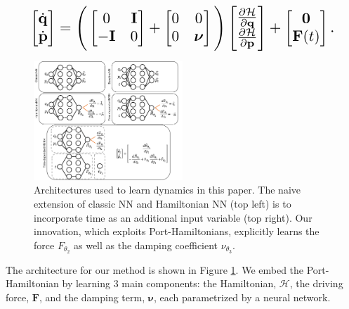 \documentclass[twoside]{article}
\begin{document}
\begin{equation}
\resizebox{0.9\linewidth}{!}{$%
\begin{bmatrix}
\dot{\mathbf{q}} \\
\dot{\mathbf{p}}
\end{bmatrix}
=
\Bigg(\begin{bmatrix}
0 & \mathbf{I} \\
-\mathbf{I} & 0
\end{bmatrix} +
\begin{bmatrix}
0 & 0 \\
0 & \boldsymbol\nu
\end{bmatrix}
 \Bigg)
 \begin{bmatrix}
\frac{\partial \mathcal{H}}{\partial \mathbf{q}} \\
\frac{\partial \mathcal{H}}{\partial \mathbf{p}}
\end{bmatrix}
+
\begin{bmatrix}
\mathbf{0} \\
\mathbf{F}(t)
\end{bmatrix}.
$%
}%
\label{eqn.pham1}
\end{equation}
\begin{figure}[h!]
\centering
\includegraphics[width=0.5\textwidth]{figures/architecture1.pdf}
\caption{Architectures used to learn dynamics in this paper. The naive extension of classic NN and Hamiltonian NN (top left) is to incorporate time as an additional input variable (top right). Our innovation, which exploits Port-Hamiltonians, explicitly learns the force $F_{\theta_2}$ as well as the damping coefficient $\nu_{\theta_3}$.}
\label{fig.architecture}
\end{figure}

The architecture for our method is shown in Figure \ref{fig.architecture}. We embed the Port-Hamiltonian by learning 3 main components: the Hamiltonian, $\mathcal{H}$, the driving force, $\mathbf{F}$, and the damping term, $\boldsymbol\nu$, each parametrized by a neural network.
\end{document}
